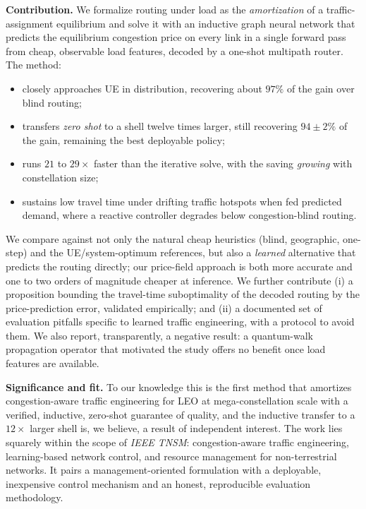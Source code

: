 \documentclass[11pt]{article}
\begin{document}
\textbf{Contribution.} We formalize routing under load as the \emph{amortization} of a
traffic-assignment equilibrium and solve it with an inductive graph neural network that
predicts the equilibrium congestion price on every link in a single forward pass from cheap,
observable load features, decoded by a one-shot multipath router. The method:
\begin{itemize}
  \item closely approaches UE in distribution, recovering about $97\%$ of the gain over
        blind routing;
  \item transfers \emph{zero shot} to a shell twelve times larger, still recovering
        $94\pm2\%$ of the gain, remaining the best deployable policy;
  \item runs $21$ to $29\times$ faster than the iterative solve, with the saving
        \emph{growing} with constellation size;
  \item sustains low travel time under drifting traffic hotspots when fed predicted demand,
        where a reactive controller degrades below congestion-blind routing.
\end{itemize}
We compare against not only the natural cheap heuristics (blind, geographic, one-step) and
the UE/system-optimum references, but also a \emph{learned} alternative that predicts the
routing directly; our price-field approach is both more accurate and one to two orders of
magnitude cheaper at inference. We further contribute (i) a proposition bounding the
travel-time suboptimality of the decoded routing by the price-prediction error, validated
empirically; and (ii) a documented set of evaluation pitfalls specific to learned traffic
engineering, with a protocol to avoid them. We also report, transparently, a negative
result: a quantum-walk propagation operator that motivated the study offers no benefit once
load features are available.

\textbf{Significance and fit.} To our knowledge this is the first method that amortizes
congestion-aware traffic engineering for LEO at mega-constellation scale with a verified,
inductive, zero-shot guarantee of quality, and the inductive transfer to a $12\times$ larger
shell is, we believe, a result of independent interest. The work lies squarely within the
scope of \emph{IEEE TNSM}: congestion-aware traffic engineering, learning-based network
control, and resource management for non-terrestrial networks. It pairs a
management-oriented formulation with a deployable, inexpensive control mechanism and an
honest, reproducible evaluation methodology.
\end{document}
